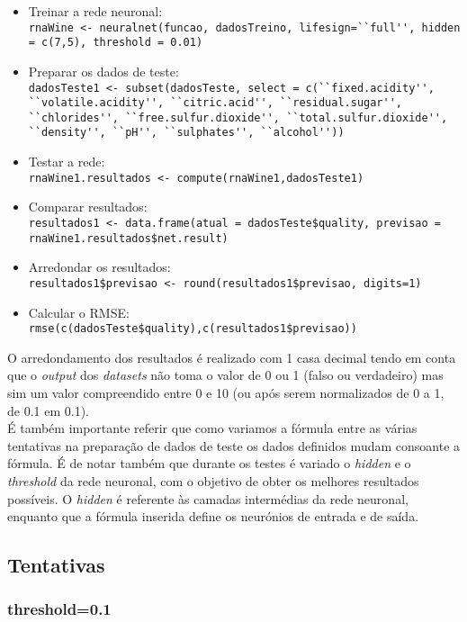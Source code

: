 \documentclass{article}
\begin{document}
\begin{itemize}
    \item Treinar a rede neuronal:\\
        \verb|rnaWine <- neuralnet(funcao, dadosTreino, lifesign=``full'', hidden = c(7,5), threshold = 0.01)|
    \item Preparar os dados de teste:\\ 
        \verb|dadosTeste1 <- subset(dadosTeste, select = c(``fixed.acidity'', ``volatile.acidity'', ``citric.acid'', ``residual.sugar'', ``chlorides'', ``free.sulfur.dioxide'', ``total.sulfur.dioxide'', ``density'', ``pH'', ``sulphates'', ``alcohol''))|
    \item Testar a rede:\\
        \verb|rnaWine1.resultados <- compute(rnaWine1,dadosTeste1)|
    \item Comparar resultados:\\
        \verb|resultados1 <- data.frame(atual = dadosTeste$quality, previsao = rnaWine1.resultados$net.result)|
    \item Arredondar os resultados:\\
        \verb|resultados1$previsao <- round(resultados1$previsao, digits=1)|
    \item Calcular o RMSE:\\
        \verb|rmse(c(dadosTeste$quality),c(resultados1$previsao))|
\end{itemize}

O arredondamento dos resultados é realizado com 1 casa decimal tendo em conta que o \textit{output} dos \textit{datasets} não toma o valor de 0 ou 1 (falso ou verdadeiro) mas sim um valor compreendido entre 0 e 10 (ou após serem normalizados de 0 a 1, de 0.1 em 0.1).\\
É também importante referir que como variamos a fórmula entre as várias tentativas na preparação de dados de teste os dados definidos mudam consoante a fórmula. É de notar também que durante os testes é variado o \textit{hidden} e o \textit{threshold} da rede neuronal, com o objetivo de obter os melhores resultados possíveis.
O \textit{hidden} é referente às camadas intermédias da rede neuronal, enquanto que a fórmula inserida define os neurónios de entrada e de saída.

\subsection{Tentativas}

\subsubsection{threshold=0.1}
\end{document}
